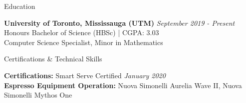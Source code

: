 \documentclass[
	11pt, %
]{resume} %
\begin{document}


\begin{rSection}{Education}

	\textbf{University of Toronto, Mississauga (UTM)} \hfill \textit{September 2019 - Present} \\
	Honours Bachelor of Science (HBSc) | CGPA: 3.03 \\
	Computer Science Specialist, Minor in Mathematics \\
\end{rSection}


\begin{rSection}{Certifications \& Technical Skills}

	\textbf{Certifications:} Smart Serve Certified \hfill \textit{January 2020} \\
	\textbf{Espresso Equipment Operation:} Nuova Simonelli Aurelia Wave II, Nuova Simonelli Mythos One \\

\end{rSection}

\end{document}
